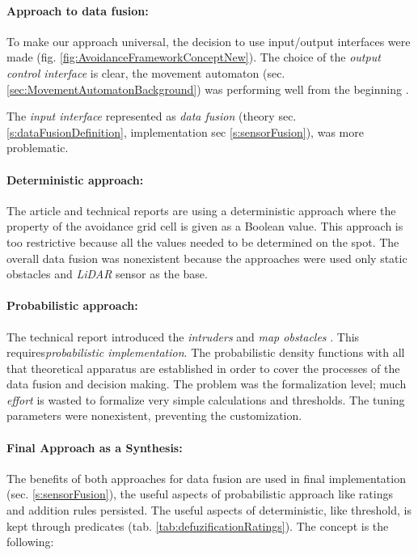 \paragraph{Approach to data fusion:} To make our approach universal, the decision to use input/output interfaces were made (fig. \ref{fig:AvoidanceFrameworkConceptNew}). The choice of the \emph{output control interface} is clear, the movement automaton (sec. \ref{sec:MovementAutomatonBackground}) was performing well from the beginning \cite{gomola2017optimal,gomola2017mpc}.

The \emph{input interface} represented as \emph{data fusion} (theory sec. \ref{s:dataFusionDefinition}, implementation sec \ref{s:sensorFusion}), was more problematic.

\paragraph{Deterministic approach:} The article \cite{gomola2017obstacle} and technical reports \cite{gomola2017mpc,gomola2017optimal} are using a deterministic approach where the property of the avoidance grid cell is given as a Boolean value. This approach is too restrictive because all the values needed to be determined on the spot. The overall data fusion was nonexistent because the approaches were used only static obstacles and \emph{LiDAR} sensor as the base. 

\paragraph{Probabilistic approach:} The technical report \cite{gomola2017probabilistic} introduced the \emph{intruders} and \emph{map obstacles} \cite{cernamaria2018}. This requires\emph{probabilistic implementation}. The probabilistic density functions with all that theoretical apparatus are established in order to cover the processes of the data fusion and decision making. The problem was the formalization level; much \emph{effort} is wasted to formalize very simple calculations and thresholds. The tuning parameters were nonexistent, preventing the customization.

\paragraph{Final Approach as a Synthesis:} The benefits of both approaches for data fusion are used in final implementation (sec. \ref{s:sensorFusion}), the useful aspects of probabilistic approach like ratings and addition rules persisted. The useful aspects of deterministic, like threshold, is kept through predicates (tab. \ref{tab:defuzificationRatings}). The concept is the following:

